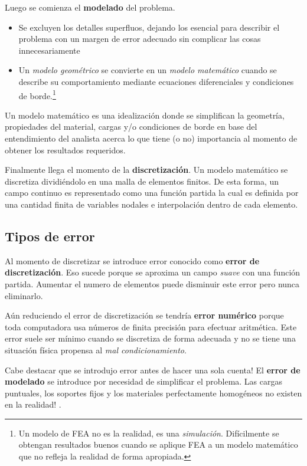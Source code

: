 \documentclass[11pt, a4paper,titlepage]{article}
\begin{document}
Luego se comienza el \textbf{modelado} del problema.
\begin{itemize}
	\item Se excluyen los detalles superfluos, dejando los esencial para describir el problema con un margen de error adecuado sin complicar las cosas innecesariamente 
	\item Un \textit{modelo geométrico} se convierte en un \textit{modelo matemático} cuando se describe su comportamiento mediante ecuaciones diferenciales y condiciones de borde.\footnote{Un modelo de FEA no es la realidad, es una \textit{simulación}. Difícilmente se obtengan resultados buenos cuando se aplique FEA a un modelo matemático que no refleja la realidad de forma apropiada.}
	\end{itemize}
Un modelo matemático es una idealización donde se simplifican la geometría, propiedades del material, cargas y/o condiciones de borde en base del entendimiento del analista acerca lo que tiene (o no) importancia al momento de obtener los resultados requeridos.


Finalmente llega el momento de la \textbf{discretización}. Un modelo matemático se discretiza dividiéndolo en una malla de elementos finitos. De esta forma, un campo continuo es representado como una función partida la cual es definida por una cantidad finita de variables nodales e interpolación dentro de cada elemento.
\vspace{-.4cm}
\subsection*{Tipos de error}
Al momento de discretizar se introduce error conocido como \textbf{error de discretización}. Eso sucede porque se aproxima un campo \textit{suave} con una función partida. Aumentar el numero de elementos puede disminuir este error pero nunca eliminarlo.

Aún reduciendo el error de discretización se tendría \textbf{error numérico} porque toda computadora usa números de finita precisión para efectuar aritmética. Este error suele ser mínimo cuando se discretiza de forma adecuada y no se tiene una situación física propensa al \textit{mal condicionamiento}.

Cabe destacar que se introdujo error antes de hacer una sola cuenta! El \textbf{error de modelado} se introduce por necesidad de simplificar el problema. Las cargas puntuales, los soportes fijos y los materiales perfectamente homogéneos no existen en la realidad! \cite{cook2007concepts}.
\end{document}
